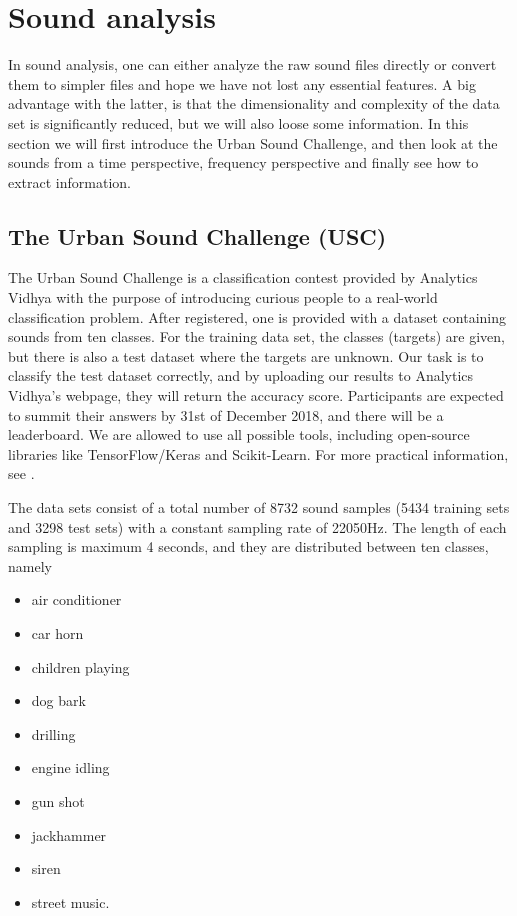 \section{Sound analysis}
In sound analysis, one can either analyze the raw sound files directly or convert them to simpler files and hope we have not lost any essential features. A big advantage with the latter, is that the dimensionality and complexity of the data set is significantly reduced, but we will also loose some information. In this section we will first introduce the Urban Sound Challenge, and then look at the sounds from a time perspective, frequency perspective and finally see how to extract information. 

\subsection{The Urban Sound Challenge (USC)}
The Urban Sound Challenge is a classification contest provided by Analytics Vidhya with the purpose of introducing curious people to a real-world classification problem. After registered, one is provided with a dataset containing sounds from ten classes. For the training data set, the classes (targets) are given, but there is also a test dataset where the targets are unknown. Our task is to classify the test dataset correctly, and by uploading our results to Analytics Vidhya's webpage, they will return the accuracy score. Participants are expected to summit their answers by 31st of December 2018, and there will be a leaderboard. We are allowed to use all possible tools, including open-source libraries like TensorFlow/Keras and Scikit-Learn. For more practical information, see \cite{USC}.

The data sets consist of a total number of 8732 sound samples (5434 training sets and 3298 test sets) with a constant sampling rate of 22050Hz. The length of each sampling is maximum 4 seconds, and they are distributed between ten classes, namely
\begin{multicols}{2}
	\begin{itemize}
		\setlength\itemsep{0.2em}
		\item air conditioner
		\item car horn
		\item children playing
		\item dog bark
		\item drilling
	\end{itemize}
	
	\columnbreak
	
	\begin{itemize}
		\setlength\itemsep{0.2em}
		\item engine idling
		\item gun shot
		\item jackhammer
		\item siren
		\item street music.
	\end{itemize}
\end{multicols}

